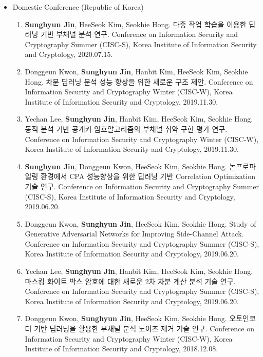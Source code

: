 \documentclass[a4paper,20pt]{article}
\begin{document}
\begin{itemize}
    \item {Domestic Conference (Republic of Korea)}
        \vspace{-6pt}
        \begin{enumerate}
            \item {\textbf{Sunghyun Jin}, HeeSeok Kim, Seokhie Hong. 다중 작업 학습을 이용한 딥러닝 기반 부채널 분석 연구. Conference on Information Security and Cryptography Summer (CISC-S), Korea Institute of Information Security and Cryptology, 2020.07.15.}
            \vspace{-2pt}
            \item {Donggeun Kwon, \textbf{Sunghyun Jin}, Hanbit Kim, HeeSeok Kim, Seokhie Hong. 차분 딥러닝 분석 성능 향상을 위한 새로운 구조 제안. Conference on Information Security and Cryptography Winter (CISC-W), Korea Institute of Information Security and Cryptology, 2019.11.30.}
            \vspace{-2pt}
            \item {Yechan Lee, \textbf{Sunghyun Jin}, Hanbit Kim, HeeSeok Kim, Seokhie Hong. 동적 분석 기반 공개키 암호알고리즘의 부채널 취약 구현 평가 연구. Conference on Information Security and Cryptography Winter (CISC-W), Korea Institute of Information Security and Cryptology, 2019.11.30.}
            \vspace{-2pt}
            \item {\textbf{Sunghyun Jin}, Donggeun Kwon, HeeSeok Kim, Seokhie Hong. 논프로파일링 환경에서 CPA 성능향상을 위한 딥러닝 기반 Correlation Optimization 기술 연구. Conference on Information Security and Cryptography Summer (CISC-S), Korea Institute of Information Security and Cryptology, 2019.06.20.}
            \vspace{-2pt}
            \item {Donggeun Kwon, \textbf{Sunghyun Jin}, HeeSeok Kim, Seokhie Hong. Study of Generative Adversarial Networks for Improving Side-Channel Attack. Conference on Information Security and Cryptography Summer (CISC-S), Korea Institute of Information Security and Cryptology, 2019.06.20.}
            \vspace{-2pt}
            \item {Yechan Lee, \textbf{Sunghyun Jin}, Hanbit Kim, HeeSeok Kim, Seokhie Hong. 마스킹 화이트 박스 암호에 대한 새로운 2차 차분 계산 분석 기술 연구. Conference on Information Security and Cryptography Summer (CISC-S), Korea Institute of Information Security and Cryptology, 2019.06.20.}
            \vspace{-2pt}
            \item {Donggeun Kwon, \textbf{Sunghyun Jin}, HeeSeok Kim, Seokhie Hong. 오토인코더 기반 딥러닝을 활용한 부채널 분석 노이즈 제거 기술 연구. Conference on Information Security and Cryptography Winter (CISC-W), Korea Institute of Information Security and Cryptology, 2018.12.08.}
            \vspace{-2pt}
        \end{enumerate}
        

\end{itemize}
\end{document}
